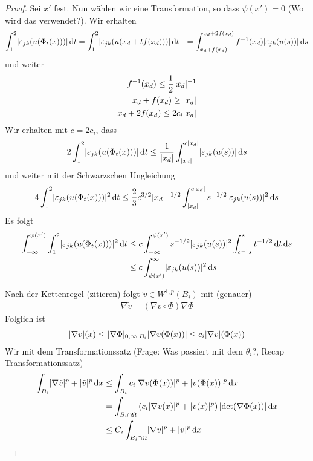 \documentclass{scrartcl}
\def\e{\varepsilon}
\newcommand{\dif}[1]{\,\mathrm{d} #1}
\DeclarePairedDelimiter{\abs}{|}{|}
\begin{document}
\begin{proof}
	Sei $x'$ fest. Nun wählen wir eine Transformation, so dass $\psi(x')=0$ (Wo wird das verwendet?). Wir erhalten
	\begin{align*}
		\int_1^2\abs{\e_{jk}(u(\Phi_t(x)))}\dif t
		&= \int_1^2\abs{\e_{jk}(u(x_d+tf(x_d)))}\dif t
		&= \int_{x_d+f(x_d)}^{x_d+2f(x_d)}f^{-1}(x_d)\abs{\e_{jk}(u(s))}\dif s
	\end{align*}
	und weiter
	\begin{align*}
		f^{-1}(x_d)\leq\frac{1}{2}\abs{x_d}^{-1} \\
		x_d+f(x_d)\geq\abs{x_d} \\
		x_d+2f(x_d)\leq 2c_i\abs{x_d}
	\end{align*}
	Wir erhalten mit $c=2c_i$, dass
	\begin{align*}
		2\int_1^2\abs{\e_{jk}(u(\Phi_t(x)))}\dif t\leq \frac{1}{\abs{x_d}}\int_{\abs{x_d}}^{c\abs{x_d}}\abs{\e_{jk}(u(s))}\dif s
	\end{align*}
	und weiter mit der Schwarzschen Ungleichung
	\begin{align*}
		4\int_1^2\abs{\e_{jk}(u(\Phi_t(x)))}^2\dif t\leq \frac{2}{3}c^{3/2}\abs{x_d}^{-1/2}\int_{\abs{x_d}}^{c\abs{x_d}}s^{-1/2}\abs{\e_{jk}(u(s))}^2\dif s
	\end{align*}
	Es folgt
	\begin{align*}
		\int_{-\infty}^{\psi(x')}\int_1^2\abs{\e_{jk}(u(\Phi_t(x)))}^2\dif t
		&\leq c\int_{-\infty}^{\psi(x')}s^{-1/2}\abs{\e_{jk}(u(s))}^2\int_{c^{-1}s}^st^{-1/2}\dif t\dif s \\
		&\leq c\int_{\psi(x')}^{\infty}\abs{\e_{jk}(u(s))}^2\dif s \\
	\end{align*}
	
	
	
	
	Nach der Kettenregel (zitieren) folgt $\tilde{v}\in W^{1,p}(B_i)$ mit (genauer)
	\begin{align*}
		\nabla \tilde{v} = (\nabla v\circ\Phi)\nabla\Phi
	\end{align*}
	Folglich ist
	\begin{align*}
		\abs{\nabla \tilde{v}}(x)\leq \abs{\nabla\Phi}_{0,\infty,B_i}\abs{\nabla v(\Phi(x))}\leq c_i\abs{\nabla v}(\Phi(x))
	\end{align*}
	Wir mit dem Transformationssatz (Frage: Was passiert mit dem $\theta_i$?, Recap Transformationssatz)
	\begin{align*}
		\int_{B_i}\abs{\nabla \tilde{v}}^p+\abs{\tilde{v}}^p \dif x
		&\leq \int_{B_i}c_i\abs{\nabla v(\Phi(x))}^p+\abs{v(\Phi(x))}^p\dif x \\
		&= \int_{B_i\cap\Omega}\left(c_i\abs{\nabla v(x)}^p+\abs{v(x)}^p\right)\abs{\det(\nabla\Phi(x))}\dif x \\
		&\leq C_i\int_{B_i\cap\Omega}\abs{\nabla v}^p+\abs{v}^p\dif x
	\end{align*}
	

\end{proof}
\end{document}
